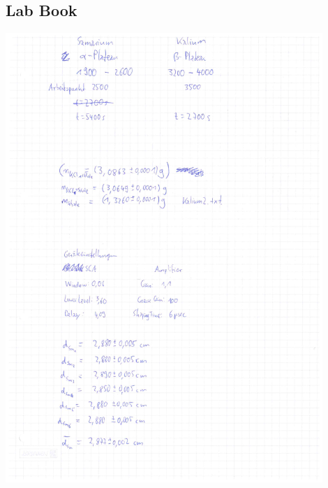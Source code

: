 \documentclass[12pt]{article}
\begin{document}
\subsection{Lab Book}\label{laborbuch}
\begin{minipage}{\textwidth}
	\centering
	\includegraphics[width=0.9\textwidth]{figures/Laborbuch-1.pdf}
\end{minipage}
\end{document}
